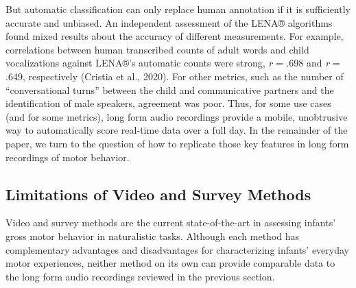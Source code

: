 \documentclass[
  man]{apa6}
\begin{document}
But automatic classification can only replace human annotation if it is sufficiently accurate and unbiased. An independent assessment of the LENA® algorithms found mixed results about the accuracy of different measurements. For example, correlations between human transcribed counts of adult words and child vocalizations against LENA®'s automatic counts were strong, \emph{r} = .698 and \emph{r} = .649, respectively (Cristia et al., 2020). For other metrics, such as the number of ``conversational turns'' between the child and communicative partners and the identification of male speakers, agreement was poor. Thus, for some use cases (and for some metrics), long form audio recordings provide a mobile, unobtrusive way to automatically score real-time data over a full day. In the remainder of the paper, we turn to the question of how to replicate those key features in long form recordings of motor behavior.

\hypertarget{limitations-of-video-and-survey-methods}{%
\subsection{Limitations of Video and Survey Methods}\label{limitations-of-video-and-survey-methods}}

Video and survey methods are the current state-of-the-art in assessing infants' gross motor behavior in naturalistic tasks. Although each method has complementary advantages and disadvantages for characterizing infants' everyday motor experiences, neither method on its own can provide comparable data to the long form audio recordings reviewed in the previous section.
\end{document}
